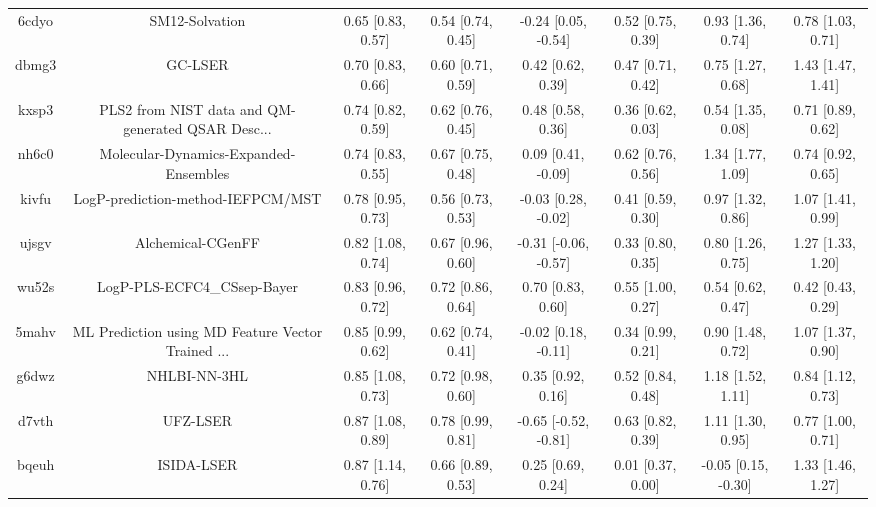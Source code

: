 \documentclass{article}
\begin{document}
\begin{center}
\begin{longtable}{|cccccccc|}
 6cdyo &                                     SM12-Solvation &  0.65 [0.83, 0.57] &  0.54 [0.74, 0.45] &   -0.24 [0.05, -0.54] &  0.52 [0.75, 0.39] &     0.93 [1.36, 0.74] &     0.78 [1.03, 0.71] \\
 dbmg3 &                                            GC-LSER &  0.70 [0.83, 0.66] &  0.60 [0.71, 0.59] &     0.42 [0.62, 0.39] &  0.47 [0.71, 0.42] &     0.75 [1.27, 0.68] &     1.43 [1.47, 1.41] \\
 kxsp3 &  PLS2 from NIST data and QM-generated QSAR Desc... &  0.74 [0.82, 0.59] &  0.62 [0.76, 0.45] &     0.48 [0.58, 0.36] &  0.36 [0.62, 0.03] &     0.54 [1.35, 0.08] &     0.71 [0.89, 0.62] \\
 nh6c0 &              Molecular-Dynamics-Expanded-Ensembles &  0.74 [0.83, 0.55] &  0.67 [0.75, 0.48] &    0.09 [0.41, -0.09] &  0.62 [0.76, 0.56] &     1.34 [1.77, 1.09] &     0.74 [0.92, 0.65] \\
 kivfu &                  LogP-prediction-method-IEFPCM/MST &  0.78 [0.95, 0.73] &  0.56 [0.73, 0.53] &   -0.03 [0.28, -0.02] &  0.41 [0.59, 0.30] &     0.97 [1.32, 0.86] &     1.07 [1.41, 0.99] \\
 ujsgv &                                  Alchemical-CGenFF &  0.82 [1.08, 0.74] &  0.67 [0.96, 0.60] &  -0.31 [-0.06, -0.57] &  0.33 [0.80, 0.35] &     0.80 [1.26, 0.75] &     1.27 [1.33, 1.20] \\
 wu52s &                        LogP-PLS-ECFC4\_CSsep-Bayer &  0.83 [0.96, 0.72] &  0.72 [0.86, 0.64] &     0.70 [0.83, 0.60] &  0.55 [1.00, 0.27] &     0.54 [0.62, 0.47] &     0.42 [0.43, 0.29] \\
 5mahv &  ML Prediction using MD Feature Vector Trained ... &  0.85 [0.99, 0.62] &  0.62 [0.74, 0.41] &   -0.02 [0.18, -0.11] &  0.34 [0.99, 0.21] &     0.90 [1.48, 0.72] &     1.07 [1.37, 0.90] \\
 g6dwz &                                       NHLBI-NN-3HL &  0.85 [1.08, 0.73] &  0.72 [0.98, 0.60] &     0.35 [0.92, 0.16] &  0.52 [0.84, 0.48] &     1.18 [1.52, 1.11] &     0.84 [1.12, 0.73] \\
 d7vth &                                           UFZ-LSER &  0.87 [1.08, 0.89] &  0.78 [0.99, 0.81] &  -0.65 [-0.52, -0.81] &  0.63 [0.82, 0.39] &     1.11 [1.30, 0.95] &     0.77 [1.00, 0.71] \\
 bqeuh &                                         ISIDA-LSER &  0.87 [1.14, 0.76] &  0.66 [0.89, 0.53] &     0.25 [0.69, 0.24] &  0.01 [0.37, 0.00] &   -0.05 [0.15, -0.30] &     1.33 [1.46, 1.27] \\

\end{longtable}
\end{center}
\end{document}
